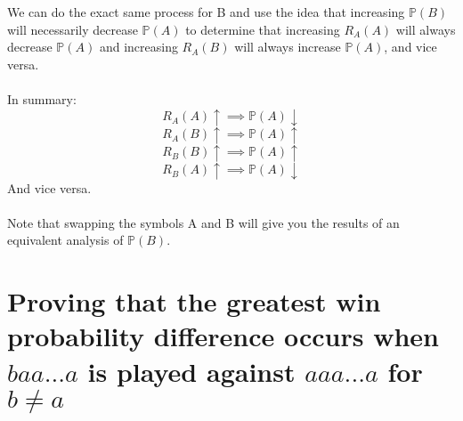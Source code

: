 \documentclass[english,12pt,a4paper,final]{article}
\begin{document}
We can do the exact same process for B and use the idea that increasing $\mathbb{P}(B)$ will necessarily decrease $\mathbb{P}(A)$ to determine that increasing $R_A(A)$ will always decrease $\mathbb{P}(A)$ and increasing $R_A(B)$ will always increase $\mathbb{P}(A)$, and vice versa.
\\\\
In summary:
\begin{equation}\label{R_A(A)change}
	R_A(A)\uparrow \implies \mathbb{P}(A)\downarrow
\end{equation}
\begin{equation}\label{R_A(B)change}
	R_A(B)\uparrow \implies \mathbb{P}(A)\uparrow
\end{equation}
\begin{equation}\label{R_B(B)change}
	R_B(B)\uparrow \implies \mathbb{P}(A)\uparrow
\end{equation}
\begin{equation}\label{R_B(A)change}
	R_B(A)\uparrow \implies \mathbb{P}(A)\downarrow
\end{equation}
And vice versa.
\\\\

Note that swapping the symbols A and B will give you the results of an equivalent analysis of $\mathbb{P}(B)$.

\section{Proving that the greatest win probability difference occurs when $baa...a$ is played against $aaa...a$ for $b\ne a$}
\end{document}
